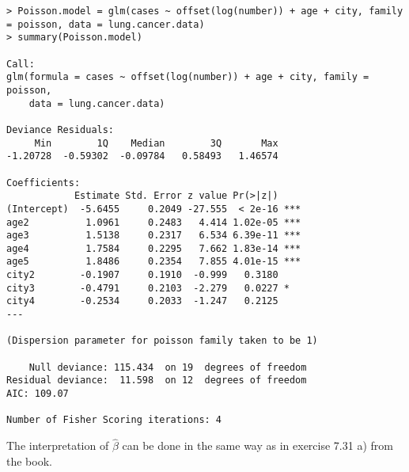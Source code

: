 \begin{lstlisting}
> Poisson.model = glm(cases ~ offset(log(number)) + age + city, family = poisson, data = lung.cancer.data)
> summary(Poisson.model)

Call:
glm(formula = cases ~ offset(log(number)) + age + city, family = poisson, 
    data = lung.cancer.data)

Deviance Residuals: 
     Min        1Q    Median        3Q       Max  
-1.20728  -0.59302  -0.09784   0.58493   1.46574  

Coefficients:
            Estimate Std. Error z value Pr(>|z|)    
(Intercept)  -5.6455     0.2049 -27.555  < 2e-16 ***
age2          1.0961     0.2483   4.414 1.02e-05 ***
age3          1.5138     0.2317   6.534 6.39e-11 ***
age4          1.7584     0.2295   7.662 1.83e-14 ***
age5          1.8486     0.2354   7.855 4.01e-15 ***
city2        -0.1907     0.1910  -0.999   0.3180    
city3        -0.4791     0.2103  -2.279   0.0227 *  
city4        -0.2534     0.2033  -1.247   0.2125    
---

(Dispersion parameter for poisson family taken to be 1)

    Null deviance: 115.434  on 19  degrees of freedom
Residual deviance:  11.598  on 12  degrees of freedom
AIC: 109.07

Number of Fisher Scoring iterations: 4
\end{lstlisting}
The interpretation of $\widehat{\beta}$ can be done in the same way as in exercise 7.31 a) from the book.

\vspace{\baselineskip}
